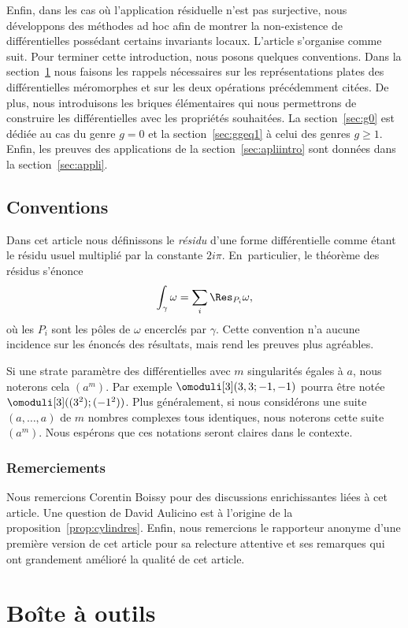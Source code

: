 Enfin, dans les cas où l'application résiduelle n'est pas surjective, nous développons des méthodes ad hoc afin de montrer la non-existence de différentielles possédant certains invariants locaux.
L'article s'organise comme suit. Pour terminer cette introduction, nous posons quelques conventions. Dans la section~\ref{sec:bao} nous faisons les rappels nécessaires sur les représentations plates des différentielles méromorphes et sur les deux opérations précédemment citées. De plus, nous introduisons les briques élémentaires qui nous permettrons de construire les différentielles avec les propriétés souhaitées. La section~\ref{sec:g0} est dédiée au cas du genre $g=0$ et la section~\ref{sec:ggeq1} à celui des genres $g\geq1$. Enfin, les preuves des applications de la section~\ref{sec:apliintro} sont données dans la section~\ref{sec:appli}.

\subsection{Conventions}
Dans cet article nous définissons le \emph{résidu} d'une forme différentielle comme étant le résidu usuel multiplié par la constante $2i\pi$. En~particulier, le théorème des résidus s'énonce
\[\int_{\gamma}\omega=\sum_{i} \Res_{P_{i}}\omega ,\]
où les $P_{i}$ sont les pôles de $\omega$ encerclés par $\gamma$. Cette convention n'a aucune incidence sur les énoncés des résultats, mais rend les preuves plus agréables.

Si une strate paramètre des différentielles avec $m$ singularités égales à $a$, nous noterons cela $(a^{m})$. Par exemple $\omoduli[3](3,3;-1,-1)$ pourra être notée $\omoduli[3]((3^{2});(-1^{2}))$. Plus généralement, si nous considérons une suite $(a,\dots,a)$ de $m$ nombres complexes tous identiques, nous noterons cette suite $(a^{m})$. Nous espérons que ces notations seront claires dans le contexte.

\subsubsection*{Remerciements}
Nous remercions Corentin Boissy pour des discussions enrichissantes liées à cet article. Une question de David Aulicino est à l'origine de la proposition~\ref{prop:cylindres}. Enfin, nous remercions le rapporteur anonyme d'une première version de cet article pour sa relecture attentive et ses remarques qui ont grandement amélioré la qualité de cet article.

\section{Boîte à outils}
\label{sec:bao}

